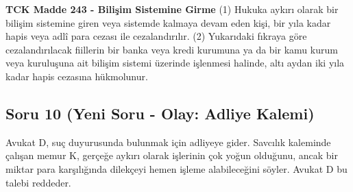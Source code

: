\documentclass[a4paper, 11pt, twocolumn]{article}
\newenvironment{lawbox}{%
    \par\noindent
    \begin{tcolorbox}[
        colback=lawbg,
        colframe=boxcolor,
        fonttitle=\bfseries,
        boxrule=0.5pt,
        left=3pt,
        right=3pt,
        top=3pt,
        bottom=3pt,
        width=\columnwidth,
        arc=2pt,
        before skip=0.2cm,
        after skip=0.2cm
    ]
    \footnotesize\itshape
}{\end{tcolorbox}}
\begin{document}
\begin{lawbox}
\textbf{TCK Madde 243 - Bilişim Sistemine Girme}
\newline
(1) Hukuka aykırı olarak bir bilişim sistemine giren veya sistemde kalmaya devam eden kişi, bir yıla kadar hapis veya adlî para cezası ile cezalandırılır.
\newline
(2) Yukarıdaki fıkraya göre cezalandırılacak fiillerin bir banka veya kredi kurumuna ya da bir kamu kurum veya kuruluşuna ait bilişim sistemi üzerinde işlenmesi halinde, altı aydan iki yıla kadar hapis cezasına hükmolunur.
\end{lawbox}

\newpage

\subsection*{Soru 10 (Yeni Soru - Olay: Adliye Kalemi)}
Avukat D, suç duyurusunda bulunmak için adliyeye gider. Savcılık kaleminde çalışan memur K, gerçeğe aykırı olarak işlerinin çok yoğun olduğunu, ancak bir miktar para karşılığında dilekçeyi hemen işleme alabileceğini söyler. Avukat D bu talebi reddeder.
\end{document}
